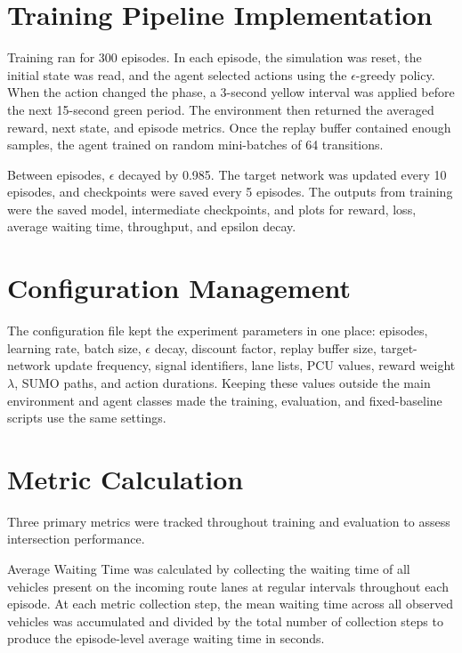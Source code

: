 \section{Training Pipeline Implementation}
\label{sec:training_pipeline}

Training ran for 300 episodes. In each episode, the simulation was reset,
the initial state was read, and the agent selected actions using the
$\epsilon$-greedy policy. When the action changed the phase, a 3-second
yellow interval was applied before the next 15-second green period. The
environment then returned the averaged reward, next state, and episode
metrics. Once the replay buffer contained enough samples, the agent
trained on random mini-batches of 64 transitions.

Between episodes, $\epsilon$ decayed by 0.985. The target network was
updated every 10 episodes, and checkpoints were saved every 5 episodes.
The outputs from training were the saved model, intermediate checkpoints,
and plots for reward, loss, average waiting time, throughput, and epsilon
decay.

\section{Configuration Management}
\label{sec:config_management}

The configuration file kept the experiment parameters in one place:
episodes, learning rate, batch size, $\epsilon$ decay, discount factor,
replay buffer size, target-network update frequency, signal identifiers,
lane lists, PCU values, reward weight $\lambda$, SUMO paths, and action
durations. Keeping these values outside the main environment and agent
classes made the training, evaluation, and fixed-baseline scripts use the
same settings.


\section{Metric Calculation}
\label{sec:metric_calculation}

Three primary metrics were tracked throughout training and evaluation to assess intersection performance.

Average Waiting Time was calculated by collecting the waiting time of all vehicles present on the incoming route lanes at regular intervals throughout each episode. At each metric collection step, the mean waiting time across all observed vehicles was accumulated and divided by the total number of collection steps to produce the episode-level average waiting time in seconds.

